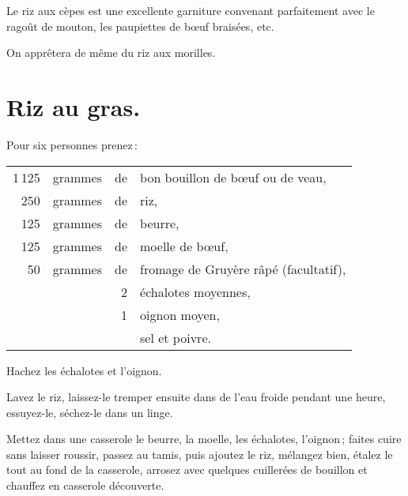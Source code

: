 Le riz aux cèpes est une excellente garniture convenant parfaitement avec le
ragoût de mouton, les paupiettes de bœuf braisées, etc.

\sk

On apprêtera de même du riz aux morilles.

\section*{\centering Riz au gras.}
{}

Pour six personnes prenez :

\footnotesize
\begin{longtable}{rrrp{16em}}
  1 125 & grammes & de & bon bouillon de bœuf ou de veau,                                                 \\
    250 & grammes & de & riz,                                                                             \\
    125 & grammes & de & beurre,                                                                          \\
    125 & grammes & de & moelle de bœuf,                                                                  \\
     50 & grammes & de & fromage de Gruyère râpé (facultatif),                                            \\
        &         &  2 & échalotes moyennes,                                                              \\
        &         &  1 & oignon moyen,                                                                    \\
        &         &    & sel et poivre.                                                                   \\
\end{longtable}
\normalsize

\label{pg0708} \hypertarget{p0708}{}
Hachez les échalotes et l'oignon.

Lavez le riz, laissez-le tremper ensuite dans de l'eau froide pendant une
heure, essuyez-le, séchez-le dans un linge.

Mettez dans une casserole le beurre, la moelle, les échalotes, l'oignon ;
faites cuire sans laisser roussir, passez au tamis, puis ajoutez le riz,
mélangez bien, étalez le tout au fond de la casserole, arrosez avec quelques
cuillerées de bouillon et chauffez en casserole découverte.

